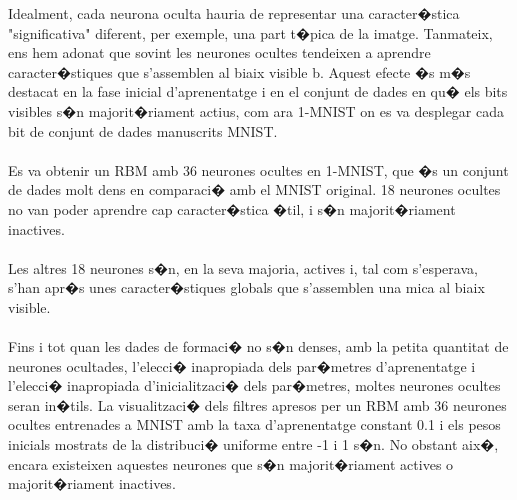 \documentclass[12pt,a4paper,openright,oneside]{article}
\numberwithin{equation}{section}
\theoremstyle{definition}
\begin{document}
Idealment, cada neurona oculta hauria de representar una caracter�stica "significativa" diferent, per exemple, una part t�pica de la imatge. Tanmateix, ens hem adonat que sovint les neurones ocultes tendeixen a aprendre caracter�stiques que s'assemblen al biaix visible b. Aquest efecte �s m�s destacat en la fase inicial d'aprenentatge i en el conjunt de dades en qu� els bits visibles s�n majorit�riament actius, com ara 1-MNIST on es va desplegar cada bit de conjunt de dades manuscrits MNIST.\\\\
Es va obtenir un RBM amb 36 neurones ocultes en 1-MNIST, que �s un conjunt de dades molt dens en comparaci� amb el MNIST original.
18 neurones ocultes no van poder aprendre cap caracter�stica �til, i s�n majorit�riament inactives.\\\\
Les altres 18 neurones s�n, en la seva majoria, actives i, tal com s'esperava, s'han apr�s unes caracter�stiques globals que s'assemblen una mica al biaix visible.\\\\
Fins i tot quan les dades de formaci� no s�n denses, amb la petita quantitat de neurones ocultades, l'elecci� inapropiada dels par�metres d'aprenentatge i l'elecci� inapropiada d'inicialitzaci� dels par�metres, moltes neurones ocultes seran in�tils. La visualitzaci� dels filtres apresos per un RBM amb 36 neurones ocultes entrenades a MNIST amb la taxa d'aprenentatge constant 0.1 i els pesos inicials mostrats de la distribuci� uniforme entre -1 i 1 s�n. No obstant aix�, encara existeixen aquestes neurones que s�n majorit�riament actives o majorit�riament inactives.
\end{document}

